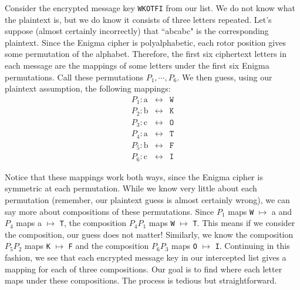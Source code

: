 \documentclass{book}
\theoremstyle{plain}
\theoremstyle{definition}
\newcommand{\ciphertext}[1]{\texttt{#1}} %
\begin{document}
Consider the encrypted message key \ciphertext{WKOTFI} from our list. We do not know what the plaintext is, but we do know it consists of three letters repeated. Let's suppose (almost certainly incorrectly) that ``abcabc" is the corresponding plaintext. Since the Enigma cipher is polyalphabetic, each rotor position gives some permutation of the alphabet. Therefore, the first six ciphertext letters in each message are the mappings of some letters under the first six Enigma permutations. Call these permutations $P_1,\cdots,P_6$. We then guess, using our plaintext assumption, the following mappings:
\begin{eqnarray*}
P_1: \text{a} &\leftrightarrow& \ciphertext{W} \\
P_2: \text{b} &\leftrightarrow& \ciphertext{K} \\
P_3: \text{c} &\leftrightarrow& \ciphertext{O} \\
P_4: \text{a} &\leftrightarrow& \ciphertext{T} \\
P_5: \text{b} &\leftrightarrow& \ciphertext{F} \\
P_6: \text{c} &\leftrightarrow& \ciphertext{I}
\end{eqnarray*}

Notice that these mappings work both ways, since the Enigma cipher is symmetric at each permutation. While we know very little about each permutation (remember, our plaintext guess is almost certainly wrong), we can say more about compositions of these permutations. Since $P_1$ maps \ciphertext{W} $\mapsto$ a and $P_4$ maps a $\mapsto$ \ciphertext{T}, the composition $P_4P_1$ maps \ciphertext{W} $\mapsto$ \ciphertext{T}. This means if we consider the composition, our guess does not matter! Similarly, we know the composition $P_5P_2$ maps \ciphertext{K} $\mapsto$ \ciphertext{F} and the composition $P_6P_3$ maps \ciphertext{O} $\mapsto$ \ciphertext{I}. Continuing in this fashion, we see that each encrypted message key in our intercepted list gives a mapping for each of three compositions. Our goal is to find where each letter maps under these compositions. The process is tedious but straightforward.
\end{document}
